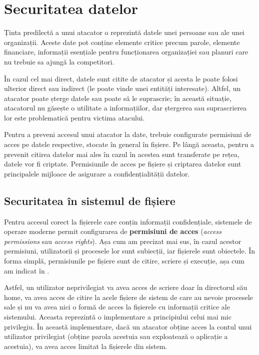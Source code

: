 \section{Securitatea datelor}
\label{sec:sec:data}

Ținta predilectă a unui atacator o reprezintă datele unei persoane sau ale unei organizații. Aceste date pot conține elemente critice precum parole, elemente financiare, informații esențiale pentru funcționarea organizației sau planuri care nu trebuie sa ajungă la competitori.

În cazul cel mai direct, datele sunt citite de atacator și acesta le poate folosi ulterior direct sau indirect (le poate vinde unei entități interesate). Altfel, un atacator poate șterge datele sau poate să le suprascrie; în această situație, atacatorul nu găsește o utilitate a informațiilor, dar ștergerea sau suprascrierea lor este problematică pentru victima atacului.

Pentru a preveni accesul unui atacator la date, trebuie configurate permisiuni de acces pe datele respective, stocate în general în fișiere. Pe lângă aceasta, pentru a prevenit citirea datelor mai ales în cazul în acestea sunt transferate pe rețea, datele vor fi criptate. Permisiunile de acces pe fișiere și criptarea datelor sunt principalele mijloace de asigurare a confidențialității datelor.

\subsection{Securitatea în sistemul de fișiere}
\label{sec:sec:data:fs}

Pentru accesul corect la fișierele care conțin informații confidențiale, sistemele de operare moderne permit configurarea de \textbf{permisiuni de acces} (\textit{access permissions} sau \textit{access rights}). Așa cum am precizat mai sus, în cazul acestor permisiuni, utilizatorii și procesele lor sunt subiecții, iar fișierele sunt obiectele. În forma simplă, permisiunile pe fișiere sunt de citire, scriere și execuție, așa cum am indicat în .

Astfel, un utilizator neprivilegiat va avea acces de scriere doar în directorul său home, va avea acces de citire la acele fișiere de sistem de care au nevoie procesele sale și nu va avea nici o formă de acces la fișierele cu informații critice ale sistemului. Aceasta reprezintă o implementare a principiului celui mai mic privilegiu. În această implementare, dacă un atacator obține acces la contul unui utilizator privilegiat (obține parola acestuia sau exploatează o aplicație a acestuia), va avea acces limitat la fișierele din sistem.

